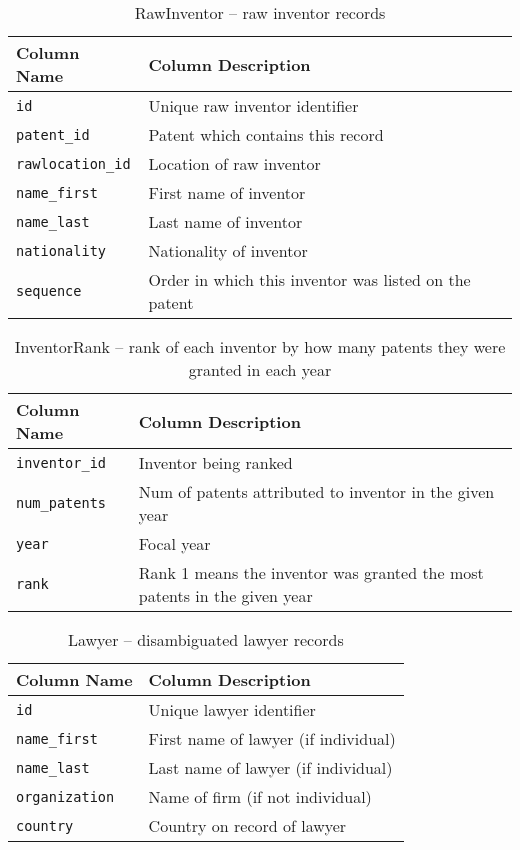 \begin{table}[ht]
\center
\begin{tabular}{| l | l |}
\hline
Column Name & Column Description \\
\hline
\verb`id` & Unique raw inventor identifier \\
\verb`patent_id` & Patent which contains this record \\
\verb`rawlocation_id` & Location of raw inventor \\
\verb`name_first` & First name of inventor \\
\verb`name_last` & Last name of inventor \\
\verb`nationality` & Nationality of inventor \\
\verb`sequence` & Order in which this inventor was listed on the patent \\
\hline
\end{tabular}
\caption{RawInventor -- raw inventor records}
\end{table}

\begin{table}[ht]
\center
\begin{tabular}{| l | l |}
\hline
Column Name & Column Description \\
\hline
\verb`inventor_id` & Inventor being ranked \\
\verb`num_patents` & Num of patents attributed to inventor in the given year \\
\verb`year` & Focal year \\
\verb`rank` & Rank 1 means the inventor was granted the most patents in the given year \\
\hline
\end{tabular}
\caption{InventorRank -- rank of each inventor by how many patents they were granted in each year}
\end{table}

\begin{table}[ht]
\center
\begin{tabular}{| l | l |}
\hline
Column Name & Column Description \\
\hline
\verb`id` & Unique lawyer identifier \\
\verb`name_first` & First name of lawyer (if individual) \\
\verb`name_last` & Last name of lawyer (if individual) \\
\verb`organization` & Name of firm (if not individual) \\
\verb`country` & Country on record of lawyer \\
\hline
\end{tabular}
\caption{Lawyer -- disambiguated lawyer records}
\end{table}

